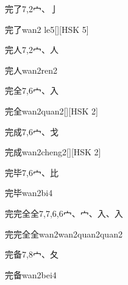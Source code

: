 \begin{entry}{完了}{7,2}{⼧、⼅}
  \begin{phonetics}{完了}{wan2 le5}[][HSK 5]
  \end{phonetics}
\end{entry}

\begin{entry}{完人}{7,2}{⼧、⼈}
  \begin{phonetics}{完人}{wan2ren2}
  \end{phonetics}
\end{entry}

\begin{entry}{完全}{7,6}{⼧、⼊}
  \begin{phonetics}{完全}{wan2quan2}[][HSK 2]
  \end{phonetics}
\end{entry}

\begin{entry}{完成}{7,6}{⼧、⼽}
  \begin{phonetics}{完成}{wan2cheng2}[][HSK 2]
  \end{phonetics}
\end{entry}

\begin{entry}{完毕}{7,6}{⼧、⽐}
  \begin{phonetics}{完毕}{wan2bi4}
  \end{phonetics}
\end{entry}

\begin{entry}{完完全全}{7,7,6,6}{⼧、⼧、⼊、⼊}
  \begin{phonetics}{完完全全}{wan2wan2quan2quan2}
  \end{phonetics}
\end{entry}

\begin{entry}{完备}{7,8}{⼧、⼡}
  \begin{phonetics}{完备}{wan2bei4}
  \end{phonetics}
\end{entry}

